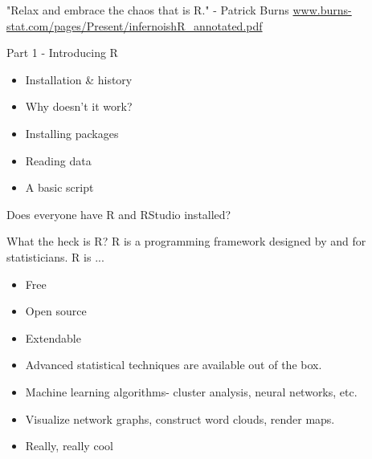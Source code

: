 \documentclass[xcolor=dvipsnames]{beamer}
\begin{document}
\begin{frame}
  "Relax and embrace the chaos that is R."
  \newline
  \newline
  - Patrick Burns
  \newline
  \newline
  \url{www.burns-stat.com/pages/Present/infernoishR_annotated.pdf}
\end{frame}

\begin{frame}{Part 1 - Introducing R}
  \begin{itemize}
    \item Installation \& history
    \item Why doesn't it work?
    \item Installing packages
    \item Reading data
    \item A basic script
  \end{itemize}
\end{frame}

\begin{frame}
Does everyone have R and RStudio installed?
\end{frame}

\begin{frame}{What the heck is R?}
  R is a programming framework designed by and for statisticians. R is ... 
  \begin{itemize}
    \item Free %
    \item Open source %
    \item Extendable %
    \item Advanced statistical techniques are available out of the box. 
    \item Machine learning algorithms- cluster analysis, neural networks, etc.%
    \item Visualize network graphs, construct word clouds, render maps. %
    \item Really, really cool 
  \end{itemize}
\end{frame}
\end{document}
